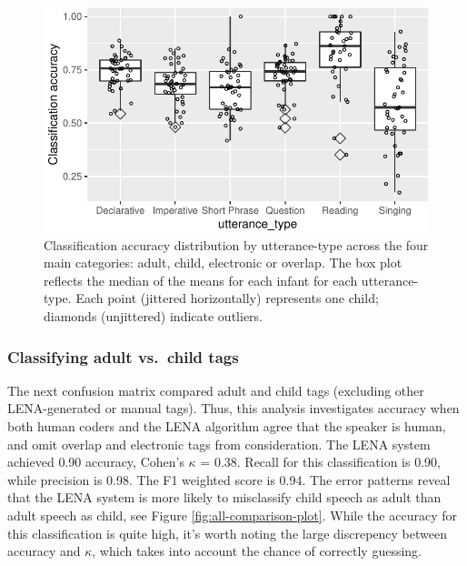 \documentclass[man,floatsintext]{apa6}
\theoremstyle{definition}
\theoremstyle{definition}
\theoremstyle{definition}
\theoremstyle{remark}
\begin{document}
\begin{figure}
\centering
\includegraphics{LTR_manuscript_files/figure-latex/utterance-type-plot-1.pdf}
\caption{\label{fig:utterance-type-plot}Classification accuracy distribution
by utterance-type across the four main categories: adult, child,
electronic or overlap. The box plot reflects the median of the means for
each infant for each utterance-type. Each point (jittered horizontally)
represents one child; diamonds (unjittered) indicate outliers.}
\end{figure}

\hypertarget{classifying-adult-vs.-child-tags}{%
\subsubsection{Classifying adult vs.~child
tags}\label{classifying-adult-vs.-child-tags}}

The next confusion matrix compared adult and child tags (excluding other
LENA-generated or manual tags). Thus, this analysis investigates
accuracy when both human coders and the LENA algorithm agree that the
speaker is human, and omit overlap and electronic tags from
consideration. The LENA system achieved 0.90 accuracy, Cohen's
\(\kappa\) = 0.38. Recall for this classification is 0.90, while
precision is 0.98. The F1 weighted score is 0.94. The error patterns
reveal that the LENA system is more likely to misclassify child speech
as adult than adult speech as child, see Figure
\ref{fig:all-comparison-plot}. While the accuracy for this
classification is quite high, it's worth noting the large discrepency
between accuracy and \(\kappa\), which takes into account the chance of
correctly guessing.
\end{document}
